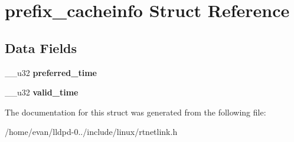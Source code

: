 \section{prefix\-\_\-cacheinfo \-Struct \-Reference}
\label{structprefix__cacheinfo}
\subsection*{\-Data \-Fields}
\begin{DoxyCompactItemize}
\item 
\-\_\-\-\_\-u32 {\bfseries preferred\-\_\-time}\label{structprefix__cacheinfo_a3e6f25fbea5b1d7f5984759b62d0a16e}

\item 
\-\_\-\-\_\-u32 {\bfseries valid\-\_\-time}\label{structprefix__cacheinfo_a0f23a5a0471cb1f6cca356d6f65887bb}

\end{DoxyCompactItemize}


\-The documentation for this struct was generated from the following file\-:\begin{DoxyCompactItemize}
\item 
/home/evan/lldpd-\/0../include/linux/rtnetlink.\-h\end{DoxyCompactItemize}
